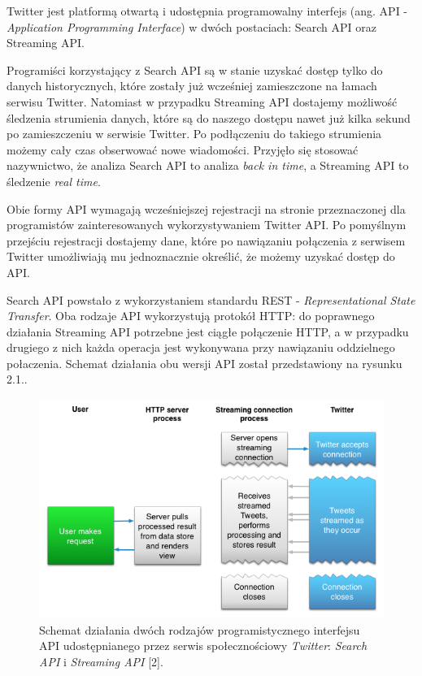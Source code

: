 Twitter jest platformą otwartą i udostępnia programowalny interfejs (ang. API - \textit{Application Programming Interface}) w dwóch postaciach: Search API oraz Streaming API.

Programiści korzystający z Search API są w stanie uzyskać dostęp tylko do danych historycznych, które zostały już wcześniej zamieszczone na łamach serwisu Twitter. Natomiast w przypadku Streaming API dostajemy możliwość śledzenia strumienia danych, które są do naszego dostępu nawet już kilka sekund po zamieszczeniu w serwisie Twitter. Po podłączeniu do takiego strumienia możemy cały czas obserwować nowe wiadomości. Przyjęło się stosować nazywnictwo, że analiza Search API to analiza \textit{back in time}, a Streaming API to śledzenie \textit{real time}. 

Obie formy API wymagają wcześniejszej rejestracji na stronie przeznaczonej dla programistów zainteresowanych wykorzystywaniem Twitter API. Po pomyślnym przejściu rejestracji dostajemy dane, które po nawiązaniu połączenia z serwisem Twitter umożliwiają mu jednoznacznie określić, że możemy uzyskać dostęp do API. 

Search API powstało z wykorzystaniem standardu REST - \textit{Representational State Transfer}. Oba rodzaje API wykorzystują protokół HTTP: do poprawnego działania Streaming API potrzebne jest ciągłe połączenie HTTP, a w przypadku drugiego z nich każda operacja jest wykonywana przy nawiązaniu oddzielnego połaczenia. Schemat działania obu wersji API został przedstawiony na rysunku 2.1..

\begin{figure}[h] %
	\centering
	\includegraphics[width=1.0\linewidth]{img/twitter_api_comparison}
	\caption{Schemat działania dwóch rodzajów programistycznego interfejsu API udostępnianego przez serwis społecznościowy \textit{Twitter}: \textit{Search API} i \textit{Streaming API} [2].}
\end{figure}

